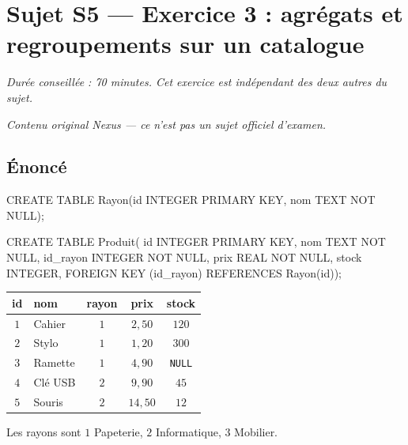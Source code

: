 \section*{Sujet S5 --- Exercice 3 : agrégats et regroupements sur un catalogue}

\textit{Durée conseillée : 70 minutes. Cet exercice est indépendant des deux
autres du sujet.}

\medskip
\textit{Contenu original Nexus --- ce n'est pas un sujet officiel d'examen.}

\subsection*{Énoncé}

\begin{sql}
CREATE TABLE Rayon(id INTEGER PRIMARY KEY, nom TEXT NOT NULL);

CREATE TABLE Produit(
    id INTEGER PRIMARY KEY, nom TEXT NOT NULL,
    id_rayon INTEGER NOT NULL, prix REAL NOT NULL, stock INTEGER,
    FOREIGN KEY (id_rayon) REFERENCES Rayon(id));
\end{sql}

\begin{center}
\begin{tabular}{|c|l|c|c|c|}
\hline
\textbf{id} & \textbf{nom} & \textbf{rayon} & \textbf{prix} & \textbf{stock} \\
\hline
$1$ & Cahier & $1$ & $2{,}50$ & $120$ \\
\hline
$2$ & Stylo & $1$ & $1{,}20$ & $300$ \\
\hline
$3$ & Ramette & $1$ & $4{,}90$ & \texttt{NULL} \\
\hline
$4$ & Clé USB & $2$ & $9{,}90$ & $45$ \\
\hline
$5$ & Souris & $2$ & $14{,}50$ & $12$ \\
\hline
\end{tabular}
\end{center}

Les rayons sont $1$ Papeterie, $2$ Informatique, $3$ Mobilier.

